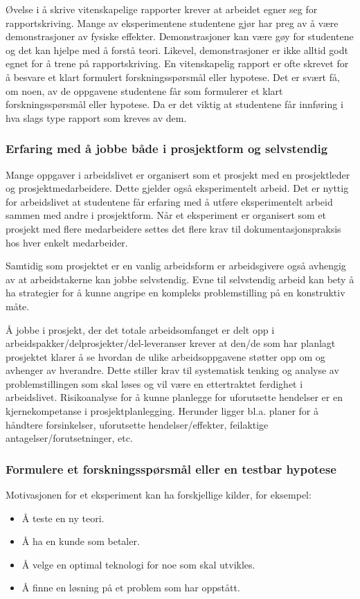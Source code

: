 \documentclass{article}
\begin{document}
Øvelse i å skrive vitenskapelige rapporter krever at arbeidet egner seg for rapportskriving. Mange av eksperimentene studentene gjør har preg av å være demonstrasjoner av fysiske effekter. Demonstrasjoner kan være gøy for studentene og det kan hjelpe med å forstå teori. Likevel, demonstrasjoner er ikke alltid godt egnet for å trene på rapportskriving. En vitenskapelig rapport er ofte skrevet for å besvare et klart formulert forskningsspørsmål eller hypotese. Det er svært få, om noen, av de oppgavene studentene får som formulerer et klart forskningsspørsmål eller hypotese. Da er det viktig at studentene får innføring i hva slags type rapport som kreves av dem.

\subsubsection{Erfaring med å jobbe både i prosjektform og selvstendig}
Mange oppgaver i arbeidslivet er organisert som et prosjekt med en prosjektleder og prosjektmedarbeidere.
Dette gjelder også eksperimentelt arbeid.
Det er nyttig for arbeidslivet at studentene får erfaring med å utføre eksperimentelt arbeid sammen med andre i prosjektform.
Når et eksperiment er organisert som et prosjekt med flere medarbeidere settes det flere krav til dokumentasjonspraksis hos hver enkelt medarbeider.

Samtidig som prosjektet er en vanlig arbeidsform er arbeidsgivere også avhengig av at arbeidstakerne kan jobbe selvstendig.
Evne til selvstendig arbeid kan bety å ha strategier for å kunne angripe en kompleks problemstilling på en konstruktiv måte.

Å jobbe i prosjekt, der det totale arbeidsomfanget er delt opp i arbeidspakker/delprosjekter/del-leveranser krever at den/de som har planlagt prosjektet klarer å se hvordan de ulike arbeidsoppgavene støtter opp om og avhenger av hverandre.
Dette stiller krav til systematisk tenking og analyse av problemstillingen som skal løses og vil være en ettertraktet ferdighet i arbeidslivet.
Risikoanalyse for å kunne planlegge for uforutsette hendelser er en kjernekompetanse i prosjektplanlegging.
Herunder ligger bl.a. planer for å håndtere forsinkelser, uforutsette hendelser/effekter, feilaktige antagelser/forutsetninger, etc.

\subsubsection{Formulere et forskningsspørsmål eller en testbar hypotese}
Motivasjonen for et eksperiment kan ha forskjellige kilder, for eksempel:
\begin{itemize}
  \item Å teste en ny teori.
  \item Å ha en kunde som betaler.
  \item Å velge en optimal teknologi for noe som skal utvikles.
  \item Å finne en løsning på et problem som har oppstått.
\end{itemize}
\end{document}
